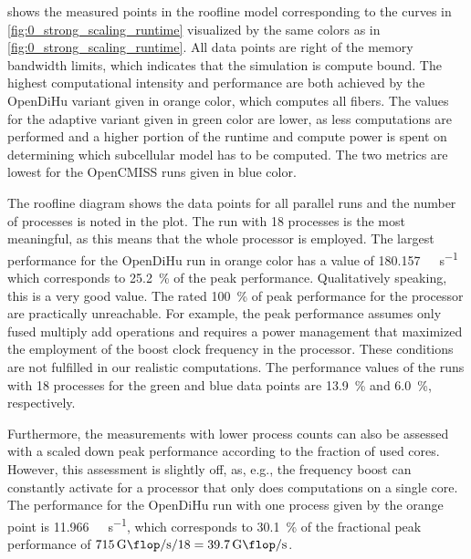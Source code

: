  shows the measured points in the roofline model corresponding to the curves in \cref{fig:0_strong_scaling_runtime} visualized by the same colors as in \cref{fig:0_strong_scaling_runtime}. All data points are right of the memory bandwidth limits, which indicates that the simulation is compute bound. 
The highest computational intensity and performance are both achieved by the OpenDiHu variant given in orange color, which computes all fibers. The values for the adaptive variant given in green color are lower, as less computations are performed and a higher portion of the runtime and compute power is spent on determining which subcellular model has to be computed. The two metrics are lowest for the OpenCMISS runs given in blue color.

The roofline diagram shows the data points for all parallel runs and the number of processes is noted in the plot. The run with 18 processes is the most meaningful, as this means that the whole processor is employed. The largest performance for the OpenDiHu run in orange color has a value of \SI{180.157}{\giga\flop\per\second} which corresponds to \SI{25.2}{\percent} of the peak performance. Qualitatively speaking, this is a very good value. The rated \SI{100}{\percent} of peak performance for the processor are practically unreachable. For example, the peak performance assumes only fused multiply add operations and requires a power management that maximized the employment of the boost clock frequency in the processor. These conditions are not fulfilled in our realistic computations.
The performance values of the runs with 18 processes for the green and blue data points are \SI{13.9}{\percent} and \SI{6.0}{\percent}, respectively. 

Furthermore, the measurements with lower process counts can also be assessed with a scaled down peak performance according to the fraction of used cores. However, this assessment is slightly off, as, e.g., the frequency boost can constantly activate for a processor that only does computations on a single core. The performance for the OpenDiHu run with one process given by the orange point is \SI{11.966}{\giga\flop\per\second}, which corresponds to \SI{30.1}{\percent} of the fractional peak performance of $\SI{715}{\giga\flop\per\second}/18 = \SI{39.7}{\giga\flop\per\second}$.

